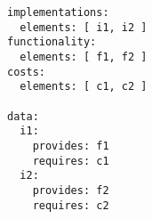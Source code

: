 \begin{verbatim}
implementations:
  elements: [ i1, i2 ]
functionality:
  elements: [ f1, f2 ]
costs:
  elements: [ c1, c2 ]

data:
  i1:
    provides: f1
    requires: c1
  i2:
    provides: f2
    requires: c2

\end{verbatim}